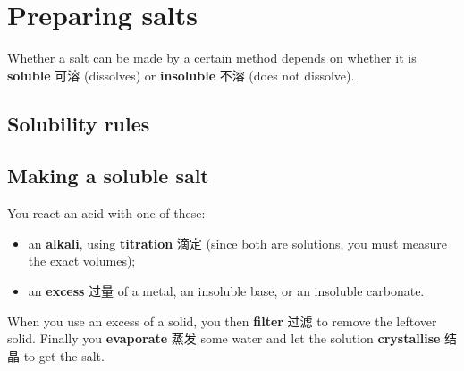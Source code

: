 \documentclass[11pt]{article}
\begin{document}
\section*{Preparing salts}

Whether a salt can be made by a certain method depends on whether it is \textbf{soluble} 可溶 (dissolves) or \textbf{insoluble} 不溶 (does not dissolve).

\subsection*{Solubility rules}

\begin{center}
\end{center}

\subsection*{Making a soluble salt}

You react an acid with one of these:

\begin{itemize}
\item an \textbf{alkali}, using \textbf{titration} 滴定 (since both are solutions, you must measure the exact volumes);

\item an \textbf{excess} 过量 of a metal, an insoluble base, or an insoluble carbonate.

\end{itemize}

When you use an excess of a solid, you then \textbf{filter} 过滤 to remove the leftover solid. Finally you \textbf{evaporate} 蒸发 some water and let the solution \textbf{crystallise} 结晶 to get the salt.
\end{document}
